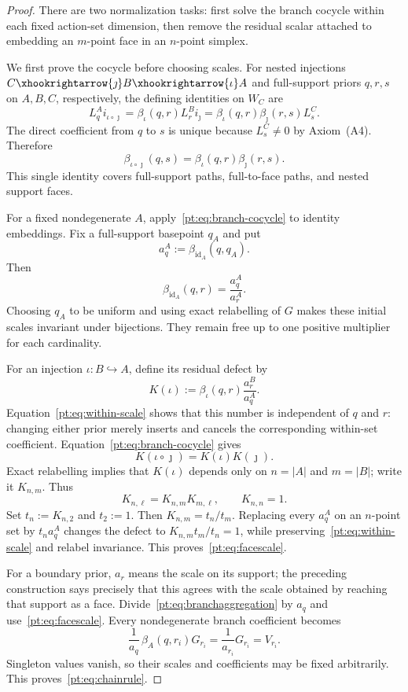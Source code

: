 \begin{proof}
There are two normalization tasks: first solve the branch cocycle within each
fixed action-set dimension, then remove the residual scalar attached to
embedding an $m$-point face in an $n$-point simplex.

We first prove the cocycle before choosing scales.  For nested injections
$C\xhookrightarrow{\jmath}B\xhookrightarrow{\iota}A$ and full-support
priors $q,r,s$ on $A,B,C$, respectively, the defining identities on $W_C$
are
\[
 L_q^A i_{\iota\circ\jmath}
 =\beta_\iota(q,r)L_r^B i_\jmath
 =\beta_\iota(q,r)\beta_\jmath(r,s)L_s^C.
\]
The direct coefficient from $q$ to $s$ is unique because $L_s^C\ne0$ by
Axiom~\textup{(A4)}.  Therefore
\begin{equation}
 \beta_{\iota\circ\jmath}(q,s)
 =\beta_\iota(q,r)\beta_\jmath(r,s).
\label{pt:eq:branch-cocycle}
\end{equation}
This single identity covers full-support paths, full-to-face paths, and
nested support faces.

For a fixed nondegenerate $A$, apply~\eqref{pt:eq:branch-cocycle} to identity
embeddings.  Fix a full-support basepoint $q_A$ and put
\[
 a_q^A:=\beta_{\mathrm{id}_A}(q,q_A).
\]
Then
\[
 \beta_{\mathrm{id}_A}(q,r)=\frac{a_q^A}{a_r^A}.
\tag{WS}\label{pt:eq:within-scale}
\]
Choosing $q_A$ to be uniform and using exact relabelling of $G$ makes these
initial scales invariant under bijections.  They remain free up to one
positive multiplier for each cardinality.

For an injection $\iota:B\hookrightarrow A$, define its residual defect by
\[
 K(\iota):=\beta_\iota(q,r)\frac{a_r^B}{a_q^A}.
\]
Equation~\eqref{pt:eq:within-scale} shows that this number is independent of
$q$ and $r$: changing either prior merely inserts and cancels the
corresponding within-set coefficient.  Equation~\eqref{pt:eq:branch-cocycle}
gives
\[
 K(\iota\circ\jmath)=K(\iota)K(\jmath).
\]
Exact relabelling implies that $K(\iota)$ depends only on
$n=|A|$ and $m=|B|$; write it $K_{n,m}$.  Thus
\[
 K_{n,\ell}=K_{n,m}K_{m,\ell},\qquad K_{n,n}=1.
\]
Set $t_n:=K_{n,2}$ and $t_2:=1$.  Then
$K_{n,m}=t_n/t_m$.  Replacing every $a_q^A$ on an $n$-point set by
$t_n a_q^A$ changes the defect to
$K_{n,m}t_m/t_n=1$, while preserving~\eqref{pt:eq:within-scale} and
relabel invariance.  This proves~\eqref{pt:eq:facescale}.

For a boundary prior, $a_r$ means the scale on its support; the preceding
construction says precisely that this agrees with the scale obtained by
reaching that support as a face.  Divide~\eqref{pt:eq:branchaggregation} by
$a_q$ and use~\eqref{pt:eq:facescale}.  Every nondegenerate branch coefficient
becomes
\[
 \frac1{a_q}\,\beta_A(q,r_i)G_{r_i}
 =\frac1{a_{r_i}}G_{r_i}=V_{r_i}.
\]
Singleton values vanish, so their scales and coefficients may be fixed
arbitrarily.  This proves~\eqref{pt:eq:chainrule}.
\end{proof}


